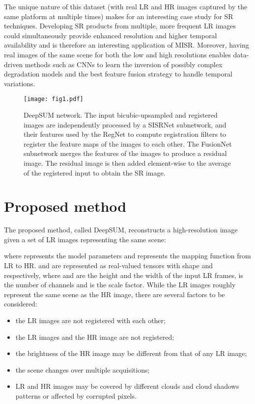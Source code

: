\documentclass[journal]{IEEEtran}
\begin{document}
The unique nature of this dataset (with real LR and HR images captured by the same platform at multiple times) makes for an interesting case study for SR techniques. Developing SR products from multiple, more frequent LR images could simultaneously provide enhanced resolution and higher temporal availability and is therefore an interesting application of MISR. Moreover, having real images of the same scene for both the low and high resolutions enables data-driven methods such as CNNs to learn the inversion of possibly complex degradation models and the best feature fusion strategy to handle temporal variations.

\begin{figure*}[t]
\centering
\texttt{[image: fig1.pdf]}
\vspace{-0.15cm}
\caption{DeepSUM network. The  input bicubic-upsampled and registered images are independently processed by a SISRNet subnetwork, and their features used by the RegNet to compute registration filters to register the feature maps of the  images to each other. The FusionNet subnetwork merges the features of the images to produce a residual image. The residual image is then added element-wise to the average of the registered input to obtain the SR image.}
\vspace{-0.15cm}
\label{fig:Architecture}
\end{figure*}

 
\section{Proposed method}
\label{sec:method}
The proposed method, called DeepSUM, reconstructs a high-resolution image  given a set of  LR images   representing the same scene:

where  represents the model parameters and  represents the mapping function from LR to HR.
 and  are represented as real-valued tensors with shape  and  respectively, where  and  are the height and the width of the input LR frames,  is the number of channels and  is the scale factor. 
While the LR images roughly represent the same scene as the HR image, there are several factors to be considered:
\begin{itemize}
    \item the LR images are not registered with each other; 
    \item the LR images and the HR image are not registered;
    \item the brightness of the HR image may be different from that of any LR image;
    \item the scene changes over multiple acquisitions;
    \item LR and HR images may be covered by different clouds and cloud shadows patterns or affected by corrupted pixels. \end{itemize}
\end{document}
